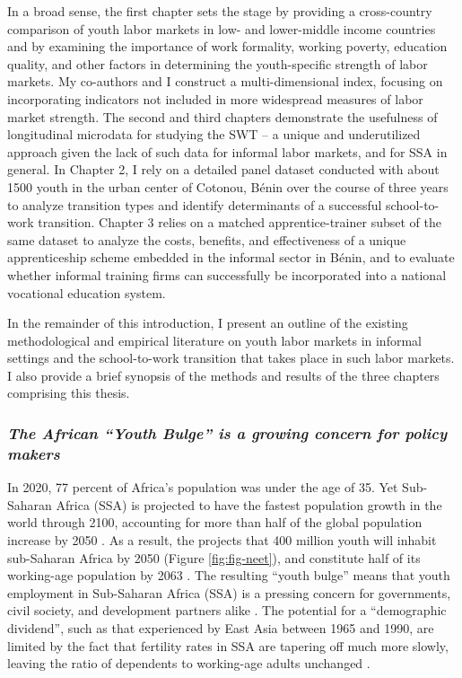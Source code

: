 \documentclass[
  a4paper, twoside, 12pt]{book}
\begin{document}
In a broad sense, the first chapter sets the stage by providing a cross-country comparison of youth labor markets in low- and lower-middle income countries and by examining the importance of work formality, working poverty, education quality, and other factors in determining the youth-specific strength of labor markets. My co-authors and I construct a multi-dimensional index, focusing on incorporating indicators not included in more widespread measures of labor market strength. The second and third chapters demonstrate the usefulness of longitudinal microdata for studying the SWT -- a unique and underutilized approach given the lack of such data for informal labor markets, and for SSA in general. In Chapter 2, I rely on a detailed panel dataset conducted with about 1500 youth in the urban center of Cotonou, Bénin over the course of three years to analyze transition types and identify determinants of a successful school-to-work transition. Chapter 3 relies on a matched apprentice-trainer subset of the same dataset to analyze the costs, benefits, and effectiveness of a unique apprenticeship scheme embedded in the informal sector in Bénin, and to evaluate whether informal training firms can successfully be incorporated into a national vocational education system.

In the remainder of this introduction, I present an outline of the existing methodological and empirical literature on youth labor markets in informal settings and the school-to-work transition that takes place in such labor markets. I also provide a brief synopsis of the methods and results of the three chapters comprising this thesis.

\hypertarget{the-african-youth-bulge-is-a-growing-concern-for-policy-makers}{%
\subsubsection*{\texorpdfstring{\emph{The African ``Youth Bulge'' is a growing concern for policy makers}}{The African ``Youth Bulge'' is a growing concern for policy makers}}\label{the-african-youth-bulge-is-a-growing-concern-for-policy-makers}}

In 2020, 77 percent of Africa's population was under the age of 35. Yet Sub-Saharan Africa (SSA) is projected to have the fastest population growth in the world through 2100, accounting for more than half of the global population increase by 2050 \autocite{un2022}. As a result, the \textcite{unitednations2022} projects that 400 million youth will inhabit sub-Saharan Africa by 2050 (Figure \ref{fig:fig-neet}), and constitute half of its working-age population by 2063 \autocite{africandevelopmentbank2022}. The resulting ``youth bulge'' means that youth employment in Sub-Saharan Africa (SSA) is a pressing concern for governments, civil society, and development partners alike \autocite{ilo2022a}. The potential for a ``demographic dividend'', such as that experienced by East Asia between 1965 and 1990, are limited by the fact that fertility rates in SSA are tapering off much more slowly, leaving the ratio of dependents to working-age adults unchanged \autocite{eastwood2011,filmer2014}.
\end{document}
